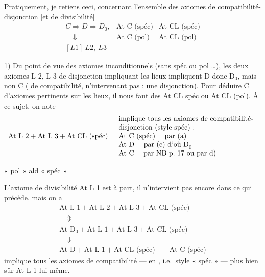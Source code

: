 \documentclass[11pt,a4paper]{article}
\begin{document}
Pratiquement, je retiens ceci, concernant l'ensemble des axiomes de compatibilité-disjonction [et de divisibilité]
\[
  \begin{array}{lll}
    C \Rightarrow D \Rightarrow D_0 , & \text{At C (spéc)} & \text{At CL (spéc)} \\
    \quad \Downarrow & \text{At C (pol)} & \text{At CL (pol)} \\
    {[L 1]}\ L 2,\ L 3 & &
  \end{array}
\]

1) Du point de vue des axiomes inconditionnels (sans  spéc ou pol \ldots), les deux axiomes \ill{} L 2, L 3 de disjonction impliquant les lieux impliquent D donc D$_0$, mais non C (\struck{\ill{}} \ill{} de compatibilité, \ill{} \ill{} n'intervenant pas : une disjonction). Pour déduire C d'axiomes pertinents sur les lieux, il nous faut des At CL spéc ou At CL (pol). À ce sujet, on note
\[
  \text{At L 2} + \text{At L 3} + \text{At CL (spéc)} \quad
  \begin{array}{l}
    \text{implique tous les axiomes de compatibilité-} \\
    \text{disjonction (style spéc) :} \\
    \text{At C (spéc) \quad par (a)} \\
    \text{At D \quad par (c) d'où D}_0 \\
    \text{At C \quad par NB p.~17 ou par d)}
  \end{array}
\]

 « pol » ald « spéc »

L'axiome de divisibilité At L 1 est à part, il n'intervient pas encore dans ce qui précède, mais on a
\[
  \begin{array}{l}
    \text{At L 1} + \text{At L 2} + \text{At L 3} + \text{At CL (spéc)} \\
    \quad \Updownarrow \\
    \text{At D}_0 + \text{At L 1} + \text{At L 3} + \text{At CL (spéc)} \\
    \quad \Downarrow \\
    \text{At D} + \text{At L 1} + \text{At CL (spéc)} \qquad \text{At C (spéc)}
  \end{array}
\]
implique tous les axiomes de compatibilité --- en , i.e.\ style « spéc » --- plus bien sûr At L 1 lui-même.
\end{document}
